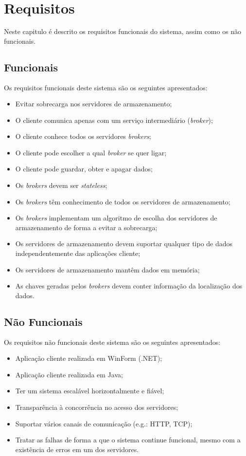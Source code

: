 \chapter{Requisitos}
Neste capitulo é descrito os requisitos funcionais do sistema, assim como os não funcionais.
\section{Funcionais}
Os requisitos funcionais deste sistema são os seguintes apresentados:
\begin{itemize}
	\item Evitar sobrecarga nos servidores de armazenamento;
	\item O cliente comunica apenas com um serviço intermediário (\textit{broker});
	\item O cliente conhece todos os servidores \textit{brokers};
	\item O cliente pode escolher a qual \textit{broker} se quer ligar;
	\item O cliente pode guardar, obter e apagar dados;
	\item Os \textit{brokers} devem ser \textit{stateless};
	\item Os \textit{brokers} têm conhecimento de todos os servidores de armazenamento;
	\item Os \textit{brokers} implementam um algoritmo de escolha dos servidores de armazenamento de forma a evitar a sobrecarga;
	\item Os servidores de armazenamento devem suportar qualquer tipo de dados independentemente das aplicações cliente;
	\item Os servidores de armazenamento mantêm dados em memória;
	\item As chaves geradas pelos \textit{brokers} devem conter informação da localização dos dados.
\end{itemize}
\section{Não Funcionais}
Os requisitos não funcionais deste sistema são os seguintes apresentados:
\begin{itemize}
	\item Aplicação cliente realizada em WinForm (.NET);
	\item Aplicação cliente realizada em Java;
	\item Ter um sistema escalável horizontalmente e fiável;
	\item Transparência à concorrência no acesso dos servidores;
	\item Suportar vários canais de comunicação (e.g.: HTTP, TCP);
	\item Tratar as falhas de forma a que o sistema continue funcional, mesmo com a existência de erros em um dos servidores.
\end{itemize}